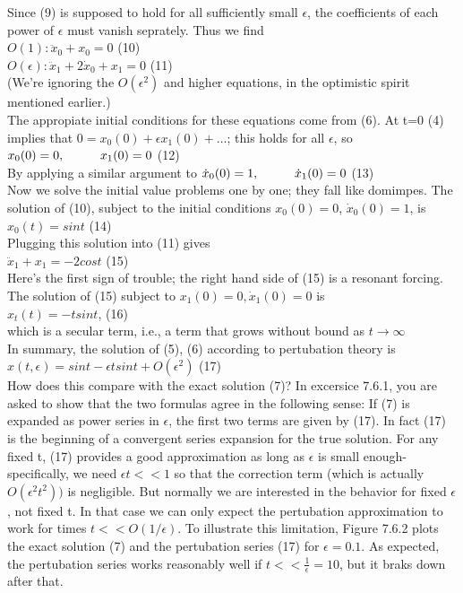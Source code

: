\documentclass{article}
\newcommand\tab[1][1cm]{\hspace*{#1}}
\begin{document}
Since (9) is supposed to hold for all sufficiently small $\epsilon$, the coefficients of each power of $\epsilon$ must vanish seprately. Thus we find \\ \tab
$O(1): \ddot{x}_{0}+x_{0}=0$ \tab (10) \\
$O(\epsilon): \ddot{x}_{1}+2\dot{x}_{0}+x_{1}=0$ \tab (11) \\
(We're ignoring the $O(\epsilon^{2})$ and higher equations, in the optimistic spirit mentioned earlier.) \\ \tab
The appropiate initial conditions for these equations come from (6). At t=0 (4) implies that $0=x_{0}(0)+\epsilon x_{1}(0)+\hdots$; this holds for all $\epsilon$, so \\ \tab
$x_{0}(0)=0, \tab x_{1}(0)=0$ \tab (12) \\
By applying a similar argument to $\dot{x}_{0}(0)=1, \tab \dot{x}_{1}(0)=0$ \tab (13) \\
Now we solve the initial value problems one by one; they fall like domimpes. The solution of (10), subject to the initial conditions $x_{0}(0)=0$, $\dot{x}_{0}(0)=1$, is \\ \tab
$x_{0}(t)=sin t$ \tab (14) \\
Plugging this solution into (11) gives \\
$\ddot{x}_{1}+x_{1}=-2cos t$ \tab (15) \\
Here's the first sign of trouble; the right hand side of (15) is a resonant forcing. The solution of (15) subject to $x_{1}(0)=0, \dot{x}_{1}(0)=0$ is \\ \tab
$x_{t}(t)=-tsint$, \tab (16) \\ 
which is a secular term, i.e., a term that grows without bound as $t \to \infty$ \\ \tab
In summary, the solution of (5), (6) according to pertubation theory is \\ \tab
$x(t, \epsilon)=sint - \epsilon t sin t + O(\epsilon^{2})$ \tab (17) \\
How does this compare with the exact solution (7)? In excersice 7.6.1, you are asked to show that the two formulas agree in the following sense: If (7) is expanded as power series in $\epsilon$, the first two terms are given by (17). In fact (17) is the beginning of a convergent series expansion for the true solution. For any fixed t, (17) provides a good approximation as long as $\epsilon$ is small enough-specifically, we need $\epsilon t<< 1$ so that the correction term (which is actually $O(\epsilon^{2}t^{2}))$ is negligible. But normally we are interested in the behavior for fixed $\epsilon$, not fixed t. In that case we can only expect the pertubation approximation to work for times $t << O(1/\epsilon)$. To illustrate this limitation, Figure 7.6.2 plots the exact solution (7) and the pertubation series (17) for $\epsilon =0.1$. As expected, the pertubation series works reasonably well if $t << \frac{1}{\epsilon}=10$, but it braks down after that. \\
\end{document}

